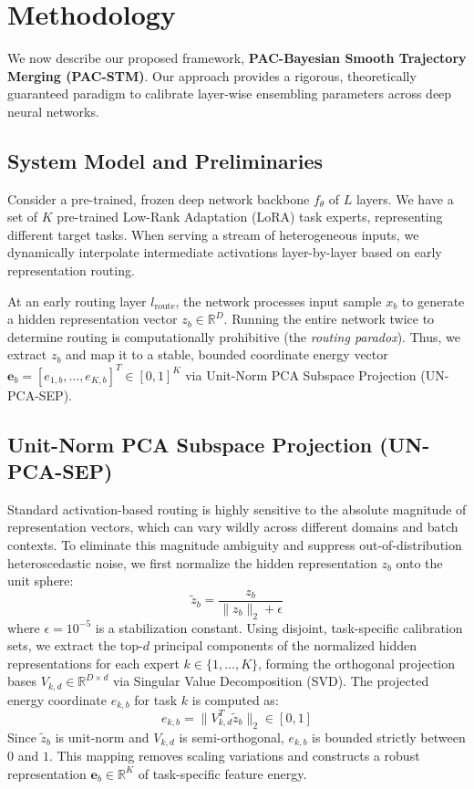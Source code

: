\section{Methodology}
\label{sec:method}

We now describe our proposed framework, \textbf{PAC-Bayesian Smooth Trajectory Merging (PAC-STM)}. Our approach provides a rigorous, theoretically guaranteed paradigm to calibrate layer-wise ensembling parameters across deep neural networks.

\subsection{System Model and Preliminaries}
Consider a pre-trained, frozen deep network backbone $f_\theta$ of $L$ layers. We have a set of $K$ pre-trained Low-Rank Adaptation (LoRA) task experts, representing different target tasks. When serving a stream of heterogeneous inputs, we dynamically interpolate intermediate activations layer-by-layer based on early representation routing.

At an early routing layer $l_{\text{route}}$, the network processes input sample $x_b$ to generate a hidden representation vector $z_b \in \mathbb{R}^D$. Running the entire network twice to determine routing is computationally prohibitive (the \emph{routing paradox}). Thus, we extract $z_b$ and map it to a stable, bounded coordinate energy vector $\mathbf{e}_b = [e_{1, b}, \dots, e_{K, b}]^T \in [0, 1]^K$ via Unit-Norm PCA Subspace Projection (UN-PCA-SEP).

\subsection{Unit-Norm PCA Subspace Projection (UN-PCA-SEP)}
Standard activation-based routing is highly sensitive to the absolute magnitude of representation vectors, which can vary wildly across different domains and batch contexts. To eliminate this magnitude ambiguity and suppress out-of-distribution heteroscedastic noise, we first normalize the hidden representation $z_b$ onto the unit sphere:
\begin{equation}
\tilde{z}_b = \frac{z_b}{\|z_b\|_2 + \epsilon}
\end{equation}
where $\epsilon = 10^{-5}$ is a stabilization constant.
Using disjoint, task-specific calibration sets, we extract the top-$d$ principal components of the normalized hidden representations for each expert $k \in \{1, \dots, K\}$, forming the orthogonal projection bases $V_{k, d} \in \mathbb{R}^{D \times d}$ via Singular Value Decomposition (SVD). The projected energy coordinate $e_{k, b}$ for task $k$ is computed as:
\begin{equation}
e_{k, b} = \|V_{k, d}^T \tilde{z}_b\|_2 \in [0, 1]
\end{equation}
Since $\tilde{z}_b$ is unit-norm and $V_{k, d}$ is semi-orthogonal, $e_{k, b}$ is bounded strictly between $0$ and $1$. This mapping removes scaling variations and constructs a robust representation $\mathbf{e}_b \in \mathbb{R}^K$ of task-specific feature energy.

